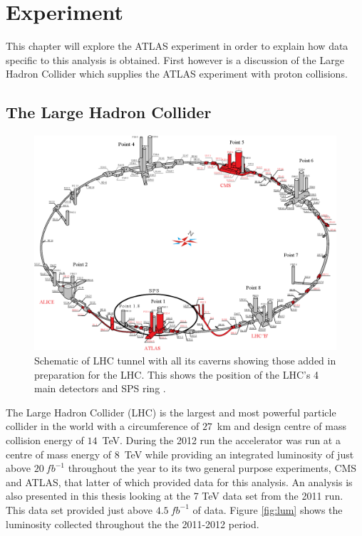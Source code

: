 \chapter{Experiment}

	This chapter will explore the ATLAS experiment in order to explain how data specific to this analysis is obtained. First however is a discussion of the Large Hadron Collider which supplies the ATLAS experiment with proton collisions.

\section{The Large Hadron Collider}

	\begin{figure}[h!]
        \begin{center}
            \includegraphics[width=0.9\linewidth]{images/LHCUnder_new.eps}
        \end{center}
        \caption{Schematic of LHC tunnel with all its caverns showing those added in preparation for the LHC. This shows the position of the LHC's 4 main detectors and SPS ring \cite{1367.2630.9.9.335}.}
        \label{fig:experimentLHC}
    \end{figure}

	The Large Hadron Collider (LHC) \cite{Bruning:782076} is the largest and most powerful particle collider in the world with a circumference of $27$~km and design centre of mass collision energy of $14$~TeV. During the 2012 run the accelerator was run at a centre of mass energy of $8$~TeV while providing an integrated luminosity of just above $20~fb^{-1}$ throughout the year to its two general purpose experiments, CMS and ATLAS, that latter of which provided data for this analysis. An analysis is also presented in this thesis looking at the 7 TeV data set from the 2011 run. This data set provided just above $4.5~fb^{-1}$ of data. Figure \ref{fig:lum} shows the luminosity collected throughout the the 2011-2012 period. 

